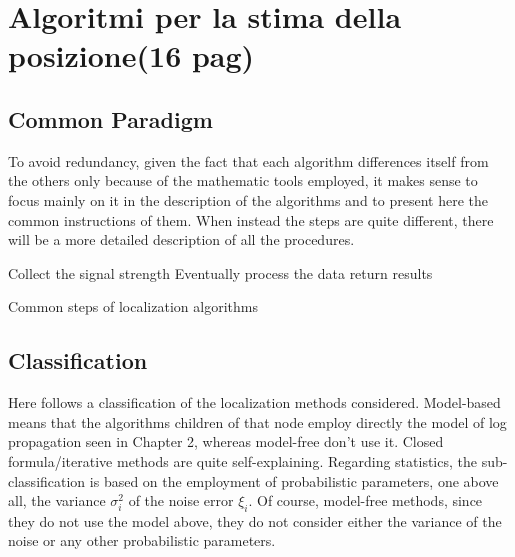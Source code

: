 \documentclass[12pt,twoside]{report}
\begin{document}
\clearpage

\chapter{Algoritmi per la stima della posizione(16 pag)}
\section{Common Paradigm}
To avoid redundancy, given the fact that each algorithm differences itself from the others only because of the mathematic tools employed, it makes sense to focus mainly on it in the description of the algorithms and to present here the common instructions of them.
When instead the steps are quite different, there will be a more detailed description of all the procedures.

\begin{algorithm}[H]
\SetAlgoLined
Collect the signal strength\;
Eventually process the data\;
return results\;
 \caption{Common steps of localization algorithms}
\end{algorithm}

\section{Classification}
Here follows a classification of the localization methods considered. Model-based means that the algorithms children of that node employ directly the model of log propagation seen in Chapter 2, whereas model-free don't use it. Closed formula/iterative methods are quite self-explaining. Regarding statistics, the sub-classification is based on the employment of probabilistic parameters, one above all, the variance $\sigma^2_i$ of the noise error $\xi_i$. Of course, model-free methods, since they do not use the model above, they do not consider either the variance of the noise or any other probabilistic parameters.

\begin{figure}
\end{figure}
\end{document}
